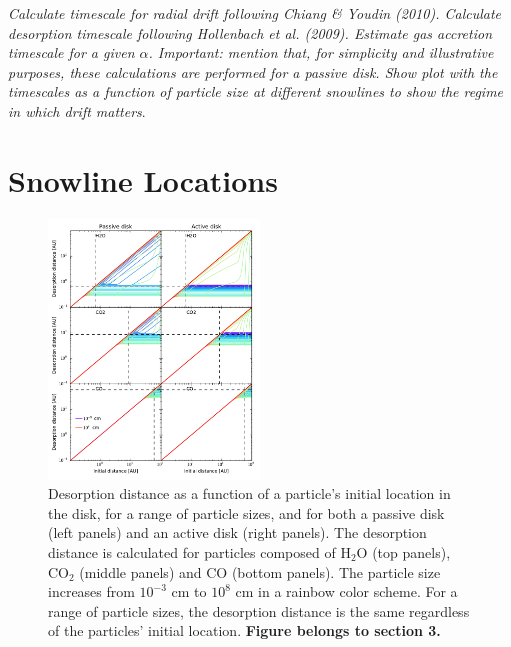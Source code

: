 \documentclass[apj]{emulateapj}
\newcommand{\emgr}[1]{\emph{ \color{gray} #1}}
\begin{document}
\emgr{Calculate timescale for radial drift following Chiang \& Youdin (2010). Calculate desorption timescale following Hollenbach et al. (2009). Estimate gas accretion timescale for a given $\alpha$. Important: mention that, for simplicity and illustrative purposes, these calculations are performed for a passive disk. Show plot with the timescales as a function of particle size at different snowlines to show the regime in which drift matters}.



\section{Snowline Locations}

\begin{figure}[h!]
\centering
\includegraphics[width=0.5\textwidth]{../../figs/desorption_distance_passive_active.pdf}
\caption{Desorption distance as a function of a particle's initial location in the disk, for a range of particle sizes, and for both a passive disk (left panels) and an active disk (right panels). The desorption distance is calculated for particles composed of H$_2$O (top panels), CO$_2$ (middle panels) and CO (bottom panels). The particle size increases from $10^{-3}$ cm to $10^8$ cm in a rainbow color scheme. For a range of particle sizes, the desorption distance is the same regardless of the particles' initial location. \textbf{Figure belongs to section 3.}}  %
\label{fig:snowlines}
\end{figure}
\end{document}
